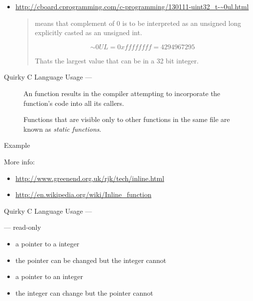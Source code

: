 \begin{itemize}
\item
  \url{http://cboard.cprogramming.com/c-programming/130111-uint32_t-~0ul.html}
  \begin{quote}
     means that complement of 0 is to be interpreted as an unsigned long
    explicitly casted as an unsigned int.

    $$\sim{}0UL = 0xffffffff = 4294967295$$

    Thats the largest value that can be in a 32 bit integer.
  \end{quote}
\end{itemize}

\begin{frame}{Quirky C Language Usage}{ --- }
  \begin{description}
  \item[] An  function results in the compiler attempting to
    incorporate the function's code into all its callers.
  \item[] Functions that are visible only to other functions in the same file
    are known as \emph{static functions}.
  \end{description}
  \begin{block}{Example}
  \end{block}
\end{frame}

More info:
\begin{itemize}
\item \url{http://www.greenend.org.uk/rjk/tech/inline.html}
\item \url{http://en.wikipedia.org/wiki/Inline_function}
\end{itemize}

\begin{frame}{Quirky C Language Usage}{ --- }
  \begin{block}{ --- read-only}
    \begin{itemize}
    \item a pointer to a  integer
    \item the pointer can be changed but the integer cannot
    \end{itemize}
    \begin{itemize}
    \item a  pointer to an integer
    \item the integer can change but the pointer cannot
    \end{itemize}
  \end{block}
\end{frame}

